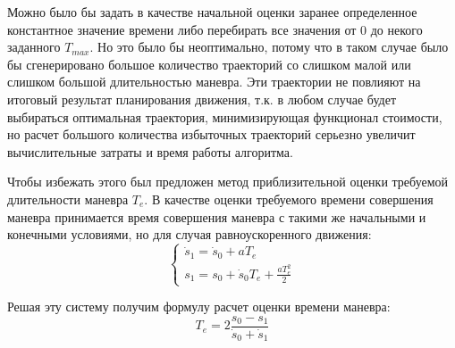 Можно было бы задать в качестве начальной оценки заранее определенное константное значение времени либо перебирать
все значения от 0 до некого заданного $T_{max}$. Но это было бы неоптимально, потому что в таком случае было бы
сгенерировано большое количество траекторий со слишком малой или слишком большой длительностью маневра. Эти траектории
не повлияют на итоговый результат планирования движения, т.к. в любом случае будет выбираться оптимальная траектория,
минимизирующая функционал стоимости, но расчет большого количества избыточных траекторий серьезно увеличит вычислительные
затраты и время работы алгоритма.

Чтобы избежать этого был предложен метод приблизительной оценки требуемой длительности маневра $T_e$. В качестве оценки
требуемого времени совершения маневра принимается время совершения маневра с такими же начальными и конечными
условиями, но для случая равноускоренного движения:
\begin{equation}
      \begin{cases}
            \dot{s}_1 = \dot{s}_0 + aT_e \\
            s_1       = s_0       + \dot{s}_0T_e + \frac{aT_e^2}{2}
      \end{cases}
\end{equation}

Решая эту систему получим формулу расчет оценки времени маневра:
\begin{equation}
      T_e = 2\frac{s_0 - s_1}{\dot{s}_0 + \dot{s}_1}
\end{equation}

